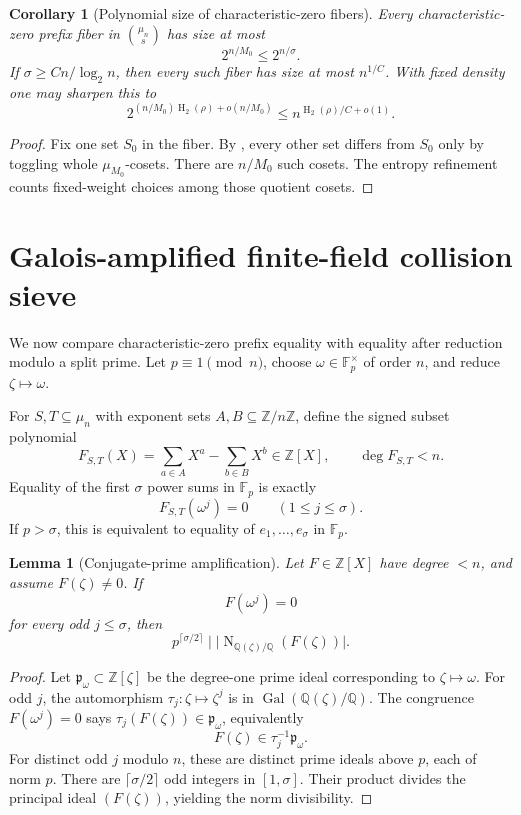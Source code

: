 \documentclass[11pt]{article}
\newtheorem{lemma}[lemma]{Lemma}
\newtheorem{corollary}[corollary]{Corollary}
\theoremstyle{definition}
\newcommand{\F}{\mathbb F}
\newcommand{\Z}{\mathbb Z}
\newcommand{\Q}{\mathbb Q}
\newcommand{\HH}{\operatorname{H}_2}
\newcommand{\Norm}{\operatorname{N}}
\begin{document}
\begin{corollary}[Polynomial size of characteristic-zero fibers]\label{cor:upstairs-poly}
Every characteristic-zero prefix fiber in $\binom{\mu_n}{s}$ has size at most
\[
        2^{n/M_0}\le 2^{n/\sigma}.
\]
If $\sigma\ge Cn/\log_2n$, then every such fiber has size at most $n^{1/C}$.  With fixed density one may sharpen this to
\[
        2^{(n/M_0)\HH(\rho)+o(n/M_0)}\le n^{\HH(\rho)/C+o(1)}.
\]
\end{corollary}

\begin{proof}
Fix one set $S_0$ in the fiber.  By , every other set differs from $S_0$ only by toggling whole $\mu_{M_0}$-cosets.  There are $n/M_0$ such cosets.  The entropy refinement counts fixed-weight choices among those quotient cosets.
\end{proof}

\section{Galois-amplified finite-field collision sieve}\label{sec:galois}

We now compare characteristic-zero prefix equality with equality after reduction modulo a split prime.  Let $p\equiv1\pmod n$, choose $\omega\in\F_p^\times$ of order $n$, and reduce $\zeta\mapsto\omega$.

For $S,T\subseteq\mu_n$ with exponent sets $A,B\subseteq\Z/n\Z$, define the signed subset polynomial
\[
        F_{S,T}(X)=\sum_{a\in A}X^a-\sum_{b\in B}X^b\in\Z[X],
        \qquad \deg F_{S,T}<n.
\]
Equality of the first $\sigma$ power sums in $\F_p$ is exactly
\[
        F_{S,T}(\omega^j)=0\qquad(1\le j\le\sigma).
\]
If $p>\sigma$, this is equivalent to equality of $e_1,\ldots,e_\sigma$ in $\F_p$.

\begin{lemma}[Conjugate-prime amplification]\label{lem:galois-amp}
Let $F\in\Z[X]$ have degree $<n$, and assume $F(\zeta)\ne0$.  If
\[
        F(\omega^j)=0
\]
for every odd $j\le\sigma$, then
\[
        p^{\lceil\sigma/2\rceil}\mid \big|\Norm_{\Q(\zeta)/\Q}(F(\zeta))\big|.
\]
\end{lemma}

\begin{proof}
Let $\mathfrak p_\omega\subset\Z[\zeta]$ be the degree-one prime ideal corresponding to $\zeta\mapsto\omega$.  For odd $j$, the automorphism $\tau_j:\zeta\mapsto\zeta^j$ is in $\operatorname{Gal}(\Q(\zeta)/\Q)$.  The congruence $F(\omega^j)=0$ says $\tau_j(F(\zeta))\in\mathfrak p_\omega$, equivalently
\[
        F(\zeta)\in\tau_j^{-1}\mathfrak p_\omega.
\]
For distinct odd $j$ modulo $n$, these are distinct prime ideals above $p$, each of norm $p$.  There are $\lceil\sigma/2\rceil$ odd integers in $[1,\sigma]$.  Their product divides the principal ideal $(F(\zeta))$, yielding the norm divisibility.
\end{proof}
\end{document}

